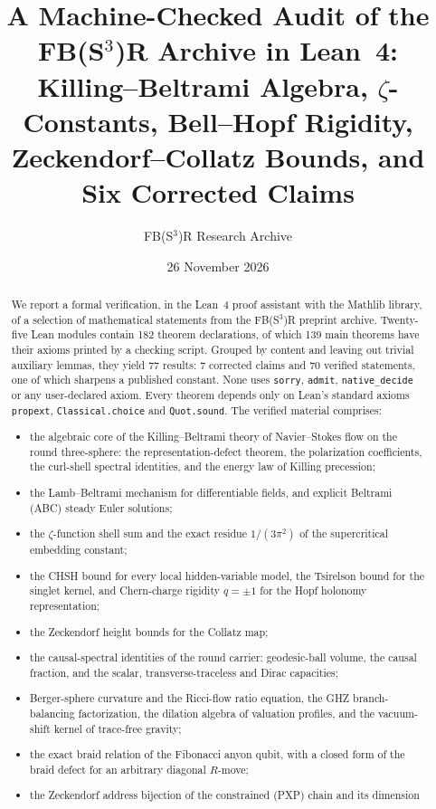 \documentclass[11pt]{article}
\title{A Machine-Checked Audit of the FB(S$^3$)R Archive in Lean~4:\\
Killing--Beltrami Algebra, $\zeta$-Constants, Bell--Hopf Rigidity,\\
Zeckendorf--Collatz Bounds, and Six Corrected Claims}
\author{FB(S$^3$)R Research Archive}
\date{26 November 2026}
\theoremstyle{remark}
\newcommand{\lean}[1]{\texttt{#1}}
\begin{document}
\maketitle

\begin{abstract}
We report a formal verification, in the Lean~4 proof assistant with the Mathlib library,
of a selection of mathematical statements from the FB(S$^3$)R preprint archive. Twenty-five Lean
modules contain 182 theorem declarations, of which 139 main theorems have their axioms printed
by a checking script. Grouped by content and leaving out trivial auxiliary
lemmas, they yield 77 results: 7 corrected claims and 70 verified statements, one of
which sharpens a published constant. None uses \lean{sorry}, \lean{admit},
\lean{native\_decide} or any user-declared axiom. Every theorem depends only on Lean's
standard axioms \lean{propext}, \lean{Classical.choice} and \lean{Quot.sound}.
The verified material comprises:
\begin{itemize}
\item the algebraic core of the Killing--Beltrami theory of Navier--Stokes flow on the round
three-sphere: the representation-defect theorem, the polarization coefficients, the curl-shell
spectral identities, and the energy law of Killing precession;
\item the Lamb--Beltrami mechanism for differentiable fields, and explicit Beltrami
(ABC) steady Euler solutions;
\item the $\zeta$-function shell sum and the exact residue $1/(3\pi^2)$ of the supercritical
embedding constant;
\item the CHSH bound for every local hidden-variable model, the Tsirelson bound for the singlet
kernel, and Chern-charge rigidity $q=\pm1$ for the Hopf holonomy representation;
\item the Zeckendorf height bounds for the Collatz map;
\item the causal-spectral identities of the round carrier: geodesic-ball volume, the causal
fraction, and the scalar, transverse-traceless and Dirac capacities;
\item Berger-sphere curvature and the Ricci-flow ratio equation, the GHZ branch-balancing
factorization, the dilation algebra of valuation profiles, and the vacuum-shift kernel of
trace-free gravity;
\item the exact braid relation of the Fibonacci anyon qubit, with a closed form of the braid
defect for an arbitrary diagonal $R$-move;
\item the Zeckendorf address bijection of the constrained (PXP) chain and its dimension

\end{itemize}
\end{abstract}
\end{document}
